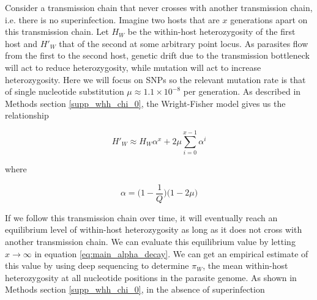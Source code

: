 \documentclass[_main.tex]{subfiles}
\begin{document}
Consider a transmission chain that never crosses with another transmission chain, i.e. there is no superinfection.  Imagine two hosts that are $x$ generations apart on this transmission chain.  Let $H_W$ be the within-host heterozygosity of the first host and $H'_W$ that of the second at some arbitrary point locus.  As parasites flow from the first to the second host, genetic drift due to the transmission bottleneck will act to reduce heterozygosity, while mutation will act to increase heterozygosity.  Here we will focus on SNPs so the relevant mutation rate is that of single nucleotide substitution $\mu \approx 1.1 \times 10^{-8}$ per generation.  As described in Methods section \ref{supp_whh_chi_0}, the Wright-Fisher model gives us the relationship




\begin{equation}
H'_W \approx H_W \alpha^x + 2 \mu \sum_{i=0}^{x-1} \alpha^i
\label{eq:main_alpha_decay}
\end{equation}

where

\begin{equation}
\alpha = \big( 1 - \frac{1}{Q} \big) \big( 1 - 2 \mu \big)
\label{eq:main_alpha}
\end{equation}


If we follow this transmission chain over time, it will eventually reach an equilibrium level of within-host heterozygosity as long as it does not cross with another transmission chain.  We can evaluate this equilibrium value by letting $x \rightarrow \infty$ in equation \ref{eq:main_alpha_decay}.  We can get an empirical estimate of this value by using deep sequencing to determine $\pi_W$, the mean within-host heterozygosity at all nucleotide positions in the parasite genome. As shown in Methods section \ref{supp_whh_chi_0}, in the absence of superinfection
\end{document}
